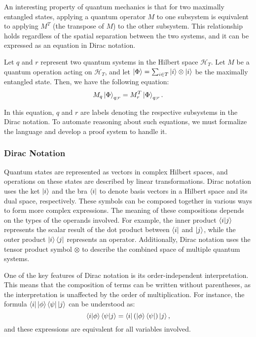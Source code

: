 An interesting property of quantum mechanics is that for two maximally entangled states, applying a quantum operator \( M \) to one subsystem is equivalent to applying \( M^T \) (the transpose of \( M \)) to the other subsystem. This relationship holds regardless of the spatial separation between the two systems, and it can be expressed as an equation in Dirac notation.
\begin{example}
    \label{ex: motivating}
    Let \( q \) and \( r \) represent two quantum systems in the Hilbert space \( \mathcal{H}_T \). Let \( M \) be a quantum operation acting on \( \mathcal{H}_T \), and let \( \ket{\Phi} = \sum_{i \in T} \ket{i} \otimes \ket{i} \) be the maximally entangled state. Then, we have the following equation:
    \[
    M_q \ket{\Phi}_{q; r} = M_r^T \ket{\Phi}_{q; r}.
    \]
\end{example}

In this equation, \( q \) and \( r \) are labels denoting the respective subsystems in the Dirac notation. To automate reasoning about such equations, we must formalize the language and develop a proof system to handle it.

\subsubsection{Dirac Notation}

Quantum states are represented as vectors in complex Hilbert spaces, and operations on these states are described by linear transformations. Dirac notation uses the ket \( \ket{i} \) and the bra \( \bra{i} \) to denote basis vectors in a Hilbert space and its dual space, respectively. These symbols can be composed together in various ways to form more complex expressions. The meaning of these compositions depends on the types of the operands involved.
For example, the inner product \( \braket{i|j} \) represents the scalar result of the dot product between \( \bra{i} \) and \( \ket{j} \), while the outer product \( \ket{i}\bra{j} \) represents an operator. Additionally, Dirac notation uses the tensor product symbol \( \otimes \) to describe the combined space of multiple quantum systems.

One of the key features of Dirac notation is its order-independent interpretation. This means that the composition of terms can be written without parentheses, as the interpretation is unaffected by the order of multiplication. For instance, the formula \( \bra{i}\ket{\phi}\bra{\psi}\ket{j} \) can be understood as:
\[
    \braket{i|\phi}\braket{\psi|j} = \bra{i} (\ket{\phi}\bra{\psi}) \ket{j},
\]
and these expressions are equivalent for all variables involved.

